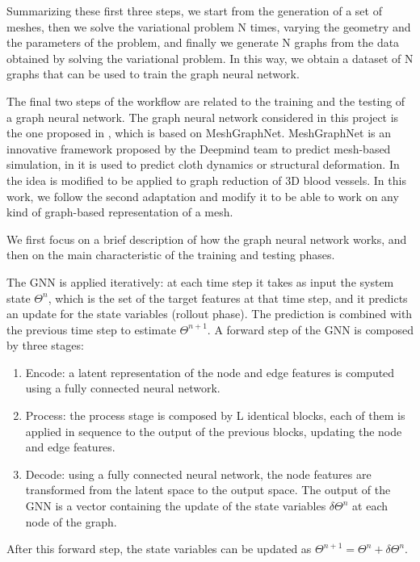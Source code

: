 \documentclass[11pt,a4paper]{article}
\begin{document}
Summarizing these first three steps, we start from the generation of a set of meshes, then we solve the variational problem N times, varying the geometry and the parameters of the problem, and finally we generate N graphs from the data obtained by solving the variational problem. In this way, we obtain a dataset of N graphs that can be used to train the graph neural network. 

The final two steps of the workflow are related to the training and the testing of a graph neural network. 
The graph neural network considered in this project is the one proposed in \cite{Luca}, which is based on MeshGraphNet.
MeshGraphNet is an innovative framework proposed by the Deepmind team to predict mesh-based simulation, in \cite{MeshGraphNet} it is used to predict cloth dynamics or structural deformation. In \cite{Luca} the idea is modified to be applied to graph reduction of 3D blood vessels. In this work, we follow the second adaptation and modify it to be able to work on any kind of graph-based representation of a mesh.

We first focus on a brief description of how the graph neural network works, and then on the main characteristic of the training and testing phases.

The GNN is applied iteratively: at each time step it takes as input the system state \(\Theta^{n}\), which is the set of the target features at that time step, and it predicts an update for the state variables (rollout phase). The prediction is combined with the previous time step to estimate \(\Theta^{n+1}\). 
A forward step of the GNN is composed by three stages:
\begin{enumerate}
    \item Encode: a latent representation of the node and edge features is computed using a fully connected neural network.
    \item Process: the process stage is composed by L identical blocks, each of them is applied in sequence to the output of the previous blocks, updating the node and edge features. 
    \item Decode: using a fully connected neural network, the node features are transformed from the latent space to the output space. The output of the GNN is a vector containing the update of the state variables \(\delta\Theta^n\) at each node of the graph. 
\end{enumerate}
After this forward step, the state variables can be updated as \(\Theta^{n+1} = \Theta^{n} + \delta\Theta^{n}\).
\end{document}
